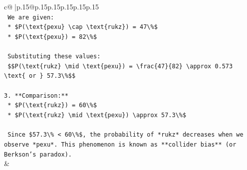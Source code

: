 \documentclass{article}
\begin{document}
{\begin{supertabular}{c@{$\;$}|p{.15\linewidth}@{}p{.15\linewidth}p{.15\linewidth}p{.15\linewidth}p{.15\linewidth}p{.15\linewidth}}
{{{\\ 
\texttt{    We are given:} \\
\texttt{    *   \$P(\textbackslash{}text\{pexu\} \textbackslash{}cap \textbackslash{}text\{rukz\}) = 47\textbackslash{}\%\$} \\
\texttt{    *   \$P(\textbackslash{}text\{pexu\}) = 82\textbackslash{}\%\$} \\
\\ 
\texttt{    Substituting these values:} \\
\texttt{    \$\$P(\textbackslash{}text\{rukz\} \textbackslash{}mid \textbackslash{}text\{pexu\}) = \textbackslash{}frac\{47\}\{82\} \textbackslash{}approx 0.573 \textbackslash{}text\{ or \} 57.3\textbackslash{}\%\$\$} \\
\\ 
\texttt{3.  **Comparison:**} \\
\texttt{    *   \$P(\textbackslash{}text\{rukz\}) = 60\textbackslash{}\%\$} \\
\texttt{    *   \$P(\textbackslash{}text\{rukz\} \textbackslash{}mid \textbackslash{}text\{pexu\}) \textbackslash{}approx 57.3\textbackslash{}\%\$} \\
\\ 
\texttt{    Since \$57.3\textbackslash{}\% < 60\textbackslash{}\%\$, the probability of *rukz* decreases when we observe *pexu*. This phenomenon is known as **collider bias** (or Berkson's paradox).} \\
            }
        }
    }
    & \\ \\


\end{supertabular}}
\end{document}
